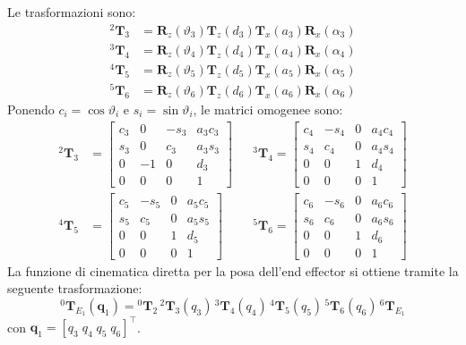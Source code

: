 Le trasformazioni sono:
\begin{align*}
{}^2\boldsymbol{T}_3&=\boldsymbol{R}_z(\vartheta_3)\boldsymbol{T}_z(d_3)\boldsymbol{T}_x(a_3)\boldsymbol{R}_x(\alpha_3) \\
{}^3\boldsymbol{T}_4&=\boldsymbol{R}_z(\vartheta_4)\boldsymbol{T}_z(d_4)\boldsymbol{T}_x(a_4)\boldsymbol{R}_x(\alpha_4) \\
{}^4\boldsymbol{T}_5&=\boldsymbol{R}_z(\vartheta_5)\boldsymbol{T}_z(d_5)\boldsymbol{T}_x(a_5)\boldsymbol{R}_x(\alpha_5) \\
{}^5\boldsymbol{T}_6&=\boldsymbol{R}_z(\vartheta_6)\boldsymbol{T}_z(d_6)\boldsymbol{T}_x(a_6)\boldsymbol{R}_x(\alpha_6)
\end{align*}
Ponendo $c_i=\cos\vartheta_i$ e $s_i=\sin\vartheta_i$, le matrici omogenee sono:
\begin{align*}
{}^2\boldsymbol{T}_3&=
\begin{bmatrix}c_3&0&-s_3&a_3c_3\\s_3&0&c_3&a_3s_3\\0&-1&0&d_3\\0&0&0&1\end{bmatrix}
&&{}^3\boldsymbol{T}_4=
\begin{bmatrix}c_4&-s_4&0&a_4c_4\\s_4&c_4&0&a_4s_4\\0&0&1&d_4\\0&0&0&1\end{bmatrix}
\\
{}^4\boldsymbol{T}_5&=
\begin{bmatrix}c_5&-s_5&0&a_5c_5\\s_5&c_5&0&a_5s_5\\0&0&1&d_5\\0&0&0&1\end{bmatrix}
&&{}^5\boldsymbol{T}_6=
\begin{bmatrix}c_6&-s_6&0&a_6c_6\\s_6&c_6&0&a_6s_6\\0&0&1&d_6\\0&0&0&1\end{bmatrix}
\end{align*}
La funzione di cinematica diretta per la posa dell'end effector si ottiene tramite la seguente trasformazione:
\begin{equation}
    {}^0\boldsymbol{T}_{E_1}(\mathbf q_1)=
    {}^0\boldsymbol{T}_2\,{}^2\boldsymbol{T}_3(q_3)\,{}^3\boldsymbol{T}_4(q_4)\,
    {}^4\boldsymbol{T}_5(q_5)\,{}^5\boldsymbol{T}_6(q_6)\,{}^6\boldsymbol{T}_{E_1}
\end{equation}
con \( \mathbf q_1=[q_3\;q_4\;q_5\;q_6]^\top \).

